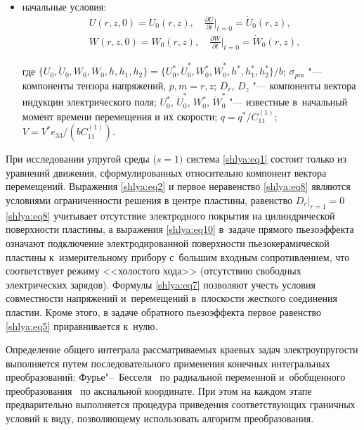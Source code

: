 \begin{itemize}
\begin{itemize}
\end{itemize}

\item начальные условия:
\begin{equation}
\label{shlya:eq11}
\begin{aligned}
& U(r,z,0)=U_0 ( r,z), \quad \frac{\partial U}{\partial t} \Big|_{t=0} =\dot {U}_0 (r,z),\\
& W(r,z,0)=W_0 (r,z), \quad \frac{\partial W}{\partial 
t}\Big|_{t=0} =\dot {W}_0 ( r,z), \end{aligned}
\end{equation}

где $\{ U_0,\dot {U}_0 ,W_0,\dot {W}_0,h,h_1 ,h_2 \}=
\{ U_0^\ast,\dot {U}_0^\ast,W_0^\ast,\dot {W}_0^\ast 
,h^\ast ,h_1^\ast ,h_2^\ast  \}/b$; 
$\sigma _{pm}$ "--- компоненты тензора напряжений, $p,m=r,z$; 
$D_r$, $D_z$ "--- компоненты  вектора индукции электрического поля; 
$U_0^\ast$, $\dot {U}_0^\ast$, $W_0^\ast$, $\dot {W}_0^\ast$ "--- известные в~начальный момент времени перемещения и их 
скорости; $q= {q^\ast }/{C_{11}^{( 1 )}}$; $V=V^\ast {e_{33}}/(bC_{11}^{( 1 )} )$.
\end{itemize}

\smallskip

При исследовании упругой среды ($s=1)$ система \eqref{shlya:eq1} состоит только из 
уравнений движения, сформулированных относительно компонент вектора 
перемещений. 
Выражения \eqref{shlya:eq2} и первое неравенство \eqref{shlya:eq8} являются условиями 
ограниченности решения в центре пластины, равенство $D_{r} |_{r=1} =0$ \eqref{shlya:eq8} 
учитывает отсутствие электродного покрытия на цилиндрической поверхности 
пластины, а выражения \eqref{shlya:eq10} в~задаче прямого пьезоэффекта означают 
подключение электродированной поверхности пьезокерамической пластины к~измерительному прибору с~большим входным сопротивлением, что соответствует режиму <<холостого хода>> (отсутствию свободных электрических 
зарядов). 
Формулы \eqref{shlya:eq7} позволяют учесть условия совместности напряжений и~перемещений в~плоскости жесткого соединения пластин. 
Кроме этого, в задаче обратного пьезоэффекта первое равенство \eqref{shlya:eq5} приравнивается к~нулю.

\smallskip

 Определение общего интеграла рассматриваемых 
краевых задач электроупругости выполняется путем последовательного 
применения конечных интегральных преобразований: Фурье"--~Бесселя~\cite{shlya:bib23} по 
радиальной переменной и~обобщенного преобразования~\cite{shlya:bib24} по аксиальной 
координате. 
При этом на каждом этапе предварительно выполняется процедура приведения соответствующих граничных условий к виду, позволяющему использовать алгоритм преобразования. 

